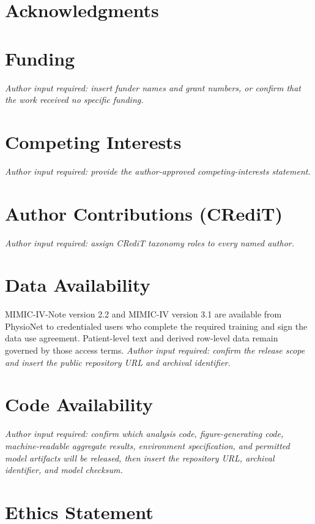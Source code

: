 \documentclass[unnumsec,webpdf,contemporary,large]{oup-authoring-template}
\begin{document}
\section*{Acknowledgments}


\section*{Funding}

\textit{Author input required: insert funder names and grant numbers, or confirm that the work received no specific funding.}

\section*{Competing Interests}

\textit{Author input required: provide the author-approved competing-interests statement.}

\section*{Author Contributions (CRediT)}

\textit{Author input required: assign CRediT taxonomy roles to every named author.}

\section*{Data Availability}

MIMIC-IV-Note version 2.2\cite{mimicnote2023} and MIMIC-IV version 3.1\cite{mimiciv2024} are available from PhysioNet to credentialed users who complete the required training and sign the data use agreement. Patient-level text and derived row-level data remain governed by those access terms. \textit{Author input required: confirm the release scope and insert the public repository URL and archival identifier.}

\section*{Code Availability}

\textit{Author input required: confirm which analysis code, figure-generating code, machine-readable aggregate results, environment specification, and permitted model artifacts will be released, then insert the repository URL, archival identifier, and model checksum.}

\section*{Ethics Statement}
\end{document}
